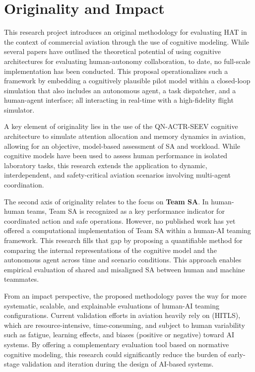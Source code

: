 \documentclass[12pt,a4paper]{article} %
\begin{document}
	
	\section{Originality and Impact}

	This research project introduces an original methodology for evaluating HAT in the context of commercial aviation through the use of cognitive modeling. While several papers have outlined the theoretical potential of using cognitive architectures for evaluating human-autonomy collaboration, to date, no full-scale implementation has been conducted. This proposal operationalizes such a framework by embedding a cognitively plausible pilot model within a closed-loop simulation that also includes an autonomous agent, a task dispatcher, and a human-agent interface; all interacting in real-time with a high-fidelity flight simulator.
	
	A key element of originality lies in the use of the QN-ACTR-SEEV cognitive architecture to simulate attention allocation and memory dynamics in aviation, allowing for an objective, model-based assessment of SA and workload. While cognitive models have been used to assess human performance in isolated laboratory tasks, this research extends the application to dynamic, interdependent, and safety-critical aviation scenarios involving multi-agent coordination.
	
	The second axis of originality relates to the focus on \textbf{Team SA}. In human-human teams, Team SA is recognized as a key performance indicator for coordinated action and safe operations. However, no published work has yet offered a computational implementation of Team SA within a human-AI teaming framework. This research fills that gap by proposing a quantifiable method for comparing the internal representations of the cognitive model and the autonomous agent across time and scenario conditions. This approach enables empirical evaluation of shared and misaligned SA between human and machine teammates.
	
	From an impact perspective, the proposed methodology paves the way for more systematic, scalable, and explainable evaluations of human-AI teaming configurations. Current validation efforts in aviation heavily rely on (HITLS), which are resource-intensive, time-consuming, and subject to human variability such as fatigue, learning effects, and biases (positive or negative) toward AI systems. By offering a complementary evaluation tool based on normative cognitive modeling, this research could significantly reduce the burden of early-stage validation and iteration during the design of AI-based systems.
	
\end{document}
